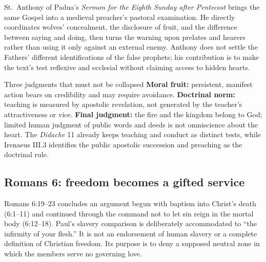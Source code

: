 \begin{deepstudy}
St.~Anthony of Padua's \emph{Sermon for the Eighth Sunday after Pentecost} brings the same Gospel into a medieval preacher's pastoral examination. He directly coordinates wolves' concealment, the disclosure of fruit, and the difference between saying and doing, then turns the warning upon prelates and hearers rather than using it only against an external enemy. Anthony does not settle the Fathers' different identifications of the false prophets; his contribution is to make the text's test reflexive and ecclesial without claiming access to hidden hearts.

\begin{studybox}{Three judgments that must not be collapsed}
\textbf{Moral fruit:} persistent, manifest action bears on credibility and may require avoidance. \textbf{Doctrinal norm:} teaching is measured by apostolic revelation, not generated by the teacher's attractiveness or vice. \textbf{Final judgment:} the fire and the kingdom belong to God; limited human judgment of public words and deeds is not omniscience about the heart. The \emph{Didache} 11 already keeps teaching and conduct as distinct tests, while Irenaeus III.3 identifies the public apostolic succession and preaching as the doctrinal rule.
\end{studybox}

\sectionguard
\subsection*{Romans 6: freedom becomes a gifted service\enspace{}}

Romans 6:19--23 concludes an argument begun with baptism into Christ's death (6:1--11) and continued through the command not to let sin reign in the mortal body (6:12--18). Paul's slavery comparison is deliberately accommodated to ``the infirmity of your flesh.'' It is not an endorsement of human slavery or a complete definition of Christian freedom. Its purpose is to deny a supposed neutral zone in which the members serve no governing love.


\end{deepstudy}

